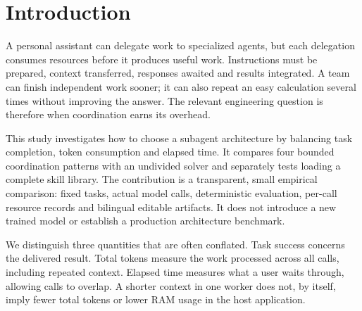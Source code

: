 \documentclass[11pt,a4paper]{article}
\begin{document}

\section{Introduction}
A personal assistant can delegate work to specialized agents, but each delegation consumes resources before it produces useful work. Instructions must be prepared, context transferred, responses awaited and results integrated. A team can finish independent work sooner; it can also repeat an easy calculation several times without improving the answer. The relevant engineering question is therefore when coordination earns its overhead.

This study investigates how to choose a subagent architecture by balancing task completion, token consumption and elapsed time. It compares four bounded coordination patterns with an undivided solver and separately tests loading a complete skill library. The contribution is a transparent, small empirical comparison: fixed tasks, actual model calls, deterministic evaluation, per-call resource records and bilingual editable artifacts. It does not introduce a new trained model or establish a production architecture benchmark.

We distinguish three quantities that are often conflated. Task success concerns the delivered result. Total tokens measure the work processed across all calls, including repeated context. Elapsed time measures what a user waits through, allowing calls to overlap. A shorter context in one worker does not, by itself, imply fewer total tokens or lower RAM usage in the host application.





\end{document}
